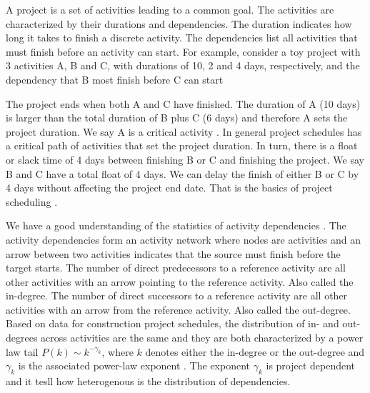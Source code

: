 \documentclass[11pt]{article}
\begin{document}
A project is a set of activities leading to a common goal. The activities are characterized by their durations and dependencies. The duration indicates how long it takes to finish a discrete activity. The dependencies list all activities that must finish before an activity can start. For example, consider a toy project with 3 activities A, B and C, with durations of 10, 2 and 4 days, respectively, and the dependency that B most finish before C can start
%
\begin{center}
\label{example}
\end{center}
%
The project ends when both A and C have finished. The duration of A (10 days) is larger than the total duration of B plus C (6 days) and therefore A sets the project duration. We say A is a critical activity \cite{pmbokguide2010}. In general project schedules has a critical path of activities that set the project duration. In turn, there is a float or slack time of 4 days between finishing B or C and finishing the project. We say B and C have a total float of 4 days. We can delay the finish of either B or C by 4 days without affecting the project end date. That is the basics of project scheduling \cite{van13}.

We have a good understanding of the statistics of activity dependencies \cite{ellinas19, santolini21, pozzana21, vazquez23}. The activity dependencies form an activity network where nodes are activities and an arrow between two activities indicates that the source must finish before the target starts. The number of direct predecessors to a reference activity are all other activities with an arrow pointing to the reference activity. Also called the in-degree. The number of direct successors to a reference activity are all other activities with an arrow from the reference activity. Also called the out-degree. Based on data for construction project schedules, the distribution of in- and out-degrees across activities are the same and they are both characterized by a power law tail $P(k)\sim k^{-\gamma_k}$, where $k$ denotes either the in-degree or the out-degree and $\gamma_k$ is the associated power-law exponent \cite{vazquez23}. The exponent $\gamma_k$ is project dependent and it tesll how heterogenous is the distribution of dependencies.
\end{document}
